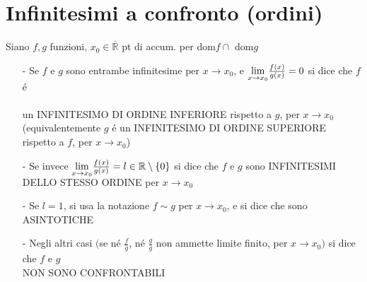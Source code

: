 \section{Infinitesimi a confronto (ordini)}
Siano $f,g$ funzioni, $x_0 \in \overline{\mathbb{R}}$ pt di accum. per dom$f \cap$ dom$g$
\begin{itemize}
\item[-]Se $f$ e $g$ sono entrambe infinitesime per $x \to x_0$, e $\smash{\displaystyle\lim_{x \to x_0}} \frac{f(x)}{g(x)}=0$ si dice che $f$ \'e \\
\\
un INFINITESIMO DI ORDINE INFERIORE rispetto a $g$, per $x \to x_0$ \\
(equivalentemente $g$ \'e un INFINITESIMO DI ORDINE SUPERIORE rispetto a $f$, per $x \to x_0$)
\item[-]Se invece $\smash{\displaystyle\lim_{x \to x_0}} \frac{f(x)}{g(x)}=l \in \mathbb{R} \setminus \{0\}$ si dice che $f$ e $g$ sono INFINITESIMI DELLO STESSO ORDINE per $x \to x_0$
\item[-]Se $l=1$, si usa la notazione $f \sim g$ per $x \to x_0$, e si dice che sono ASINTOTICHE
\item[-]Negli altri casi $\bigl($se n\'e $\frac{f}{g}$, n\'e $\frac{g}{g}$ non ammette limite finito, per $x \to x_0\bigl)$ si dice che $f$ e $g$ \\
NON SONO CONFRONTABILI
\end{itemize}

